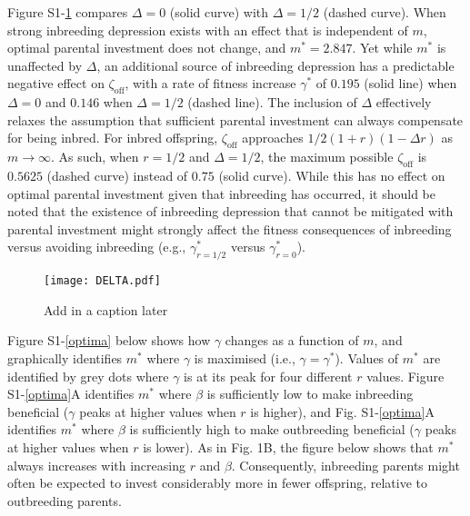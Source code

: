 \documentclass[12pt]{article}
\begin{document}
Figure S1-\ref{DELTA} compares $\Delta=0$ (solid curve) with $\Delta=1/2$ (dashed curve). When strong inbreeding depression exists with an effect that is independent of $m$, optimal parental investment does not change, and $m^{*}=2.847$. Yet while $m^{*}$ is unaffected by $\Delta$, an additional source of inbreeding depression has a predictable negative effect on $\zeta_{\textrm{off}}$, with a rate of fitness increase $\gamma^{*}$ of $0.195$ (solid line) when $\Delta=0$ and $0.146$ when $\Delta=1/2$ (dashed line). The inclusion of $\Delta$ effectively relaxes the assumption that sufficient parental investment can always compensate for being inbred. For inbred offspring, $\zeta_{\textrm{off}}$ approaches $1/2(1+r)(1 - \Delta r)$ as $m \to \infty$. As such, when $r=1/2$ and $\Delta=1/2$, the maximum possible $\zeta_{\textrm{off}}$ is $0.5625$ (dashed curve) instead of $0.75$ (solid curve). While this has no effect on optimal parental investment given that inbreeding has occurred, it should be noted that the existence of inbreeding depression that cannot be mitigated with parental investment might strongly affect the fitness consequences of inbreeding versus avoiding inbreeding (e.g., $\gamma^{*}_{r=1/2}$ versus $\gamma^{*}_{r=0}$).

\begin{figure}
\begin{center}				
\texttt{[image: DELTA.pdf]}
\end{center}
\caption{Add in a caption later}
\label{DELTA}
\end{figure}

\clearpage

\noindent Figure S1-\ref{optima} below shows how $\gamma$ changes as a function of $m$, and graphically identifies $m^{*}$ where $\gamma$ is maximised (i.e., $\gamma = \gamma^{*}$). Values of $m^{*}$ are identified by grey dots where $\gamma$ is at its peak for four different $r$ values. Figure S1-\ref{optima}A identifies $m^{*}$ where $\beta$ is sufficiently low to make inbreeding beneficial ($\gamma$ peaks at higher values when $r$ is higher), and Fig. S1-\ref{optima}A identifies $m^{*}$ where $\beta$ is sufficiently high to make outbreeding beneficial ($\gamma$ peaks at higher values when $r$ is lower). As in Fig. 1B, the figure below shows that $m^{*}$ always increases with increasing $r$ and $\beta$. Consequently, inbreeding parents might often be expected to invest considerably more in fewer offspring, relative to outbreeding parents.
\end{document}
